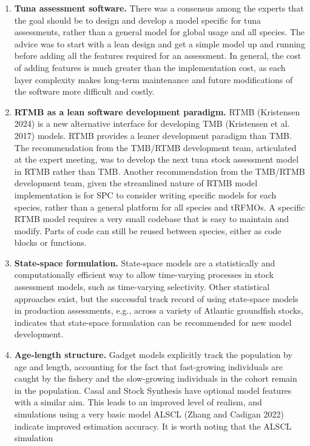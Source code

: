 \documentclass{SCreport}
\begin{document}
\begin{enumerate}
  \item \textbf{Tuna assessment software.} There was a consensus among the
  experts that the goal should be to design and develop a model specific for
  tuna assessments, rather than a general model for global usage and all
  species. The advice was to start with a lean design and get a simple model up
  and running before adding all the features required for an assessment. In
  general, the cost of adding features is much greater than the implementation
  cost, as each layer complexity makes long-term maintenance and future
  modifications of the software more difficult and costly.
  \item \textbf{RTMB as a lean software development paradigm.} RTMB (Kristensen
  2024) is a new alternative interface for developing TMB (Kristensen et al.
  2017) models. RTMB provides a leaner development paradigm than TMB. The
  recommendation from the TMB/RTMB development team, articulated at the expert
  meeting, was to develop the next tuna stock assessment model in RTMB rather
  than TMB. Another recommendation from the TMB/RTMB development team, given the
  streamlined nature of RTMB model implementation is for SPC to consider writing
  specific models for each species, rather than a general platform for all
  species and tRFMOs. A specific RTMB model requires a very small codebase that
  is easy to maintain and modify. Parts of code can still be reused between
  species, either as code blocks or functions.
  \item \textbf{State-space formulation.} State-space models are a statistically
  and computationally efficient way to allow time-varying processes in stock
  assessment models, such as time-varying selectivity. Other statistical
  approaches exist, but the successful track record of using state-space models
  in production assessments, e.g., across a variety of Atlantic groundfish
  stocks, indicates that state-space formulation can be recommended for new
  model development.
  \item \textbf{Age-length structure.} Gadget models explicitly track the
  population by age and length, accounting for the fact that fast-growing
  individuals are caught by the fishery and the slow-growing individuals in the
  cohort remain in the population. Casal and Stock Synthesis have optional model
  features with a similar aim. This leads to an improved level of realism, and
  simulations using a very basic model ALSCL (Zhang and Cadigan 2022) indicate
  improved estimation accuracy. It is worth noting that the ALSCL simulation

\end{enumerate}
\end{document}
